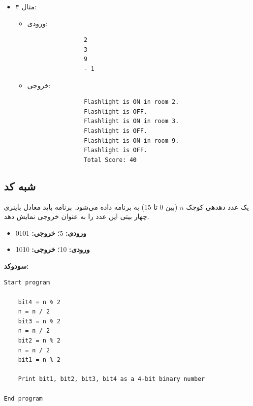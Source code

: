 \documentclass{article}
\begin{document}
\begin{itemize}
        \item مثال ۳:
        \begin{itemize}
            \item ورودی:
            \begin{LTR}
            \begin{verbatim}
                2
                3
                9
                - 1
            \end{verbatim}
            \end{LTR}
            \item خروجی:
            \begin{LTR}
            \begin{verbatim}
                Flashlight is ON in room 2.
                Flashlight is OFF.
                Flashlight is ON in room 3.
                Flashlight is OFF.
                Flashlight is ON in room 9.
                Flashlight is OFF.
                Total Score: 40
            \end{verbatim}
            \end{LTR}
        \end{itemize}
\end{itemize}

\newpage

\subsection{شبه كد}
یک عدد دهدهی کوچک \( n \) (بین 0 تا 15) به برنامه داده می‌شود. برنامه باید معادل باینری چهار بیتی این عدد را به عنوان خروجی نمایش دهد.

\begin{itemize}
    \item \textbf{ورودی:} 5؛ \textbf{خروجی:} 0101
    \item \textbf{ورودی:} 10؛ \textbf{خروجی:} 1010
\end{itemize}

\textbf{سودوكد:}
\begin{LTR}
\begin{verbatim}
Start program

    bit4 = n % 2
    n = n / 2
    bit3 = n % 2
    n = n / 2
    bit2 = n % 2
    n = n / 2
    bit1 = n % 2

    Print bit1, bit2, bit3, bit4 as a 4-bit binary number

End program
\end{verbatim}
\end{LTR}
\end{document}
